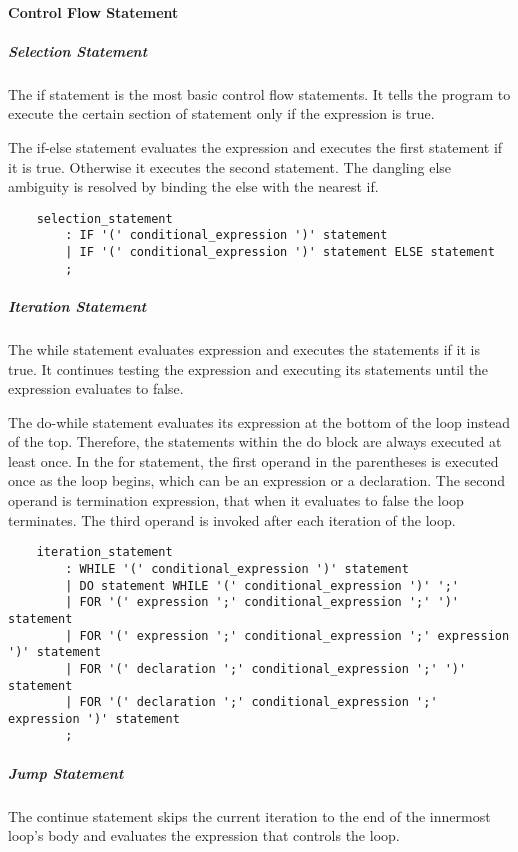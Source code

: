 \paragraph{Control Flow Statement}

\subparagraph{Selection Statement}

The if statement is the most basic control flow statements. It tells the program to execute the
certain section of statement only if the expression is true.

The if-else statement evaluates the expression and executes the first statement if it is true.
Otherwise it executes the second statement. The dangling else ambiguity is resolved by binding the
else with the nearest if.

\begin{verbatim}
    selection_statement
        : IF '(' conditional_expression ')' statement
        | IF '(' conditional_expression ')' statement ELSE statement
        ;
\end{verbatim}

\subparagraph{Iteration Statement}
The while statement evaluates expression and executes the statements if it is true. It continues
testing the expression and executing its statements until the expression evaluates to false.

The do-while statement evaluates its expression at the bottom of the loop instead of the top.
Therefore, the statements within the do block are always executed at least once.  In the for
statement, the first operand in the parentheses is executed once as the loop begins, which can be an
expression or a declaration. The second operand is termination expression, that when it evaluates to
false the loop terminates. The third operand is invoked after each iteration of the loop.

\begin{verbatim}
    iteration_statement
        : WHILE '(' conditional_expression ')' statement
        | DO statement WHILE '(' conditional_expression ')' ';'
        | FOR '(' expression ';' conditional_expression ';' ')' statement
        | FOR '(' expression ';' conditional_expression ';' expression ')' statement
        | FOR '(' declaration ';' conditional_expression ';' ')' statement
        | FOR '(' declaration ';' conditional_expression ';' expression ')' statement
        ;
\end{verbatim}

\subparagraph{Jump Statement}
The continue statement skips the current iteration to the end of the innermost loop’s body and
evaluates the expression that controls the loop.

